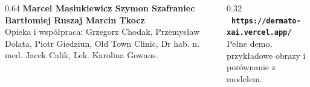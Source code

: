 \documentclass[final]{beamer}
\newcommand{\posterurl}{https://dermato-xai.vercel.app/}
\begin{document}
\begin{frame}[t]
\begin{tcolorbox}[
  enhanced,
  colback=PaleAqua,
  colframe=PaleAqua,
  arc=12mm,
  boxrule=0pt,
  width=\textwidth,
  left=14mm,
  right=14mm,
  top=8mm,
  bottom=8mm
]
  \begin{columns}[T,totalwidth=\textwidth]
    \begin{column}{0.64\textwidth}
      {\Large\bfseries\color{DeepTeal}
      Marcel Masiukiewicz \quad Szymon Szafraniec \quad Bartłomiej Ruszaj \quad Marcin Tkocz}\\[0.25em]
      {\color{MutedTeal}
      Opieka i współpraca: Grzegorz Chodak, Przemysław Dolata, Piotr Giedziun,
      Old Town Clinic, Dr hab. n. med. Jacek Calik, Lek. Karolina Gowans.}
    \end{column}
    \begin{column}{0.32\textwidth}
      \RaggedLeft
      {\Large\bfseries\color{DarkTeal}\ \texttt{\posterurl}}\\
      {\color{MutedTeal}Pełne demo, przykładowe obrazy i porównanie z modelem.}
    \end{column}
  \end{columns}
\end{tcolorbox}

\end{frame}
\end{document}
